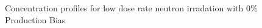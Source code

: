 \documentclass[a4paper]{article}
\begin{document}
      \begin{figure}[h!]  %
        \centering
        \qquad
        \caption{Concentration profiles for low dose rate neutron irradation with 0\% Production Bias}
        \label{figure:concentrations_neutron_0_1e-6}
      \end{figure}
\end{document}
